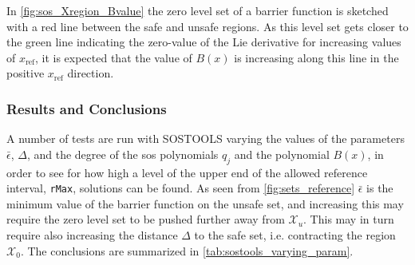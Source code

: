 In \autoref{fig:sos_Xregion_Bvalue} the zero level set of a barrier function is sketched with a red line between the safe and unsafe regions. As this level set gets  closer to the green line indicating the zero-value of the Lie derivative for increasing values of $x_\text{ref}$, it is expected that the value of  $B(x)$ is increasing along this line in the positive $x_\text{ref}$ direction.




\subsubsection{Results and Conclusions}

\vspace{-2mm}
A number of tests are run with SOSTOOLS varying the values of the parameters  $\bar{\epsilon}$, $\Delta$, and the degree of the \gls{sos} polynomials $q_j$ and the polynomial $B(x)$, %
in order to see for how high a level of the upper  end  of the allowed reference interval, \texttt{rMax}, solutions can be found.
As seen from \autoref{fig:sets_reference} $\bar{\epsilon}$ is the minimum value of the barrier function on the unsafe set, and increasing this may require the zero level set to be pushed further away from $\mathcal{X}_u$. This may in turn require also increasing the distance $\Delta$ to the safe set, i.e. contracting the region $\mathcal{X}_0$.
The conclusions are summarized in \autoref{tab:sostools_varying_param}.



